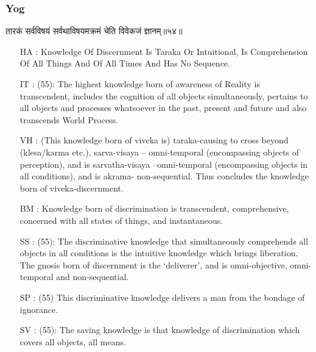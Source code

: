 \begin{frame}[fragile]\frametitle{Yog}
\begin{sanskrit}
तारकं सर्वविषयं सर्वथाविषयमक्रमं चेति विवेकजं ज्ञानम्॥५४॥
\end{sanskrit}

	\begin{itemize}
	\item [HA]: Knowledge Of Discernment Is Taraka Or Intuitional, Is Comprehension Of All Things And Of All Times And Has No Sequence.
	\item [IT]: (55): The highest knowledge born of awareness of Reality is transcendent, includes the cognition of all objects simultaneously, pertains to all objects and processes whatsoever in the past, present and future and also transcends World Process.
	\item [VH]: (This knowledge born of viveka is) taraka-causing to cross beyond (klesa/karma etc.), sarva-visaya – omni-temporal (encompassing objects of perception), and is sarvatha-visaya –omni-temporal (encompassing objects in all conditions), and is akrama- non-sequential. Thus concludes the knowledge born of viveka-discernment.
	\item [BM]: Knowledge born of discrimination is transcendent, comprehensive, concerned with all states of things, and instantaneous.
	\item [SS]: (55): The discriminative knowledge that simultaneously comprehends all objects in all conditions is the intuitive knowledge which brings liberation. The gnosis born of discernment is the ‘deliverer’, and is omni-objective, omni-temporal and non-sequential.
	\item [SP]: (55) This discriminative knowledge delivers a man from the bondage of ignorance.
	\item [SV]: (55): The saving knowledge is that knowledge of discrimination which covers all objects, all means. 
	\end{itemize}
\end{frame}

